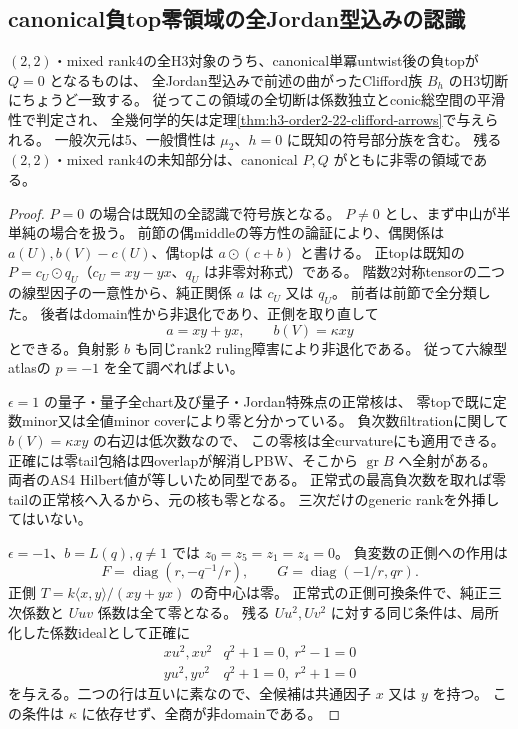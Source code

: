 \subsection{canonical負top零領域の全Jordan型込みの認識}
\label{subsec:h3-order2-22-Qzero-complete}
\begin{theorem}\label{thm:h3-order2-22-Qzero-complete}
$(2,2)$・mixed rank4の全H3対象のうち、canonical単冪untwist後の負topが $Q=0$ となるものは、
全Jordan型込みで前述の曲がったClifford族 $B_h$ のH3切断にちょうど一致する。
従ってこの領域の全切断は係数独立とconic総空間の平滑性で判定され、
全幾何学的矢は定理\ref{thm:h3-order2-22-clifford-arrows}で与えられる。
一般次元は5、一般慣性は $\mu_2$、$h=0$ に既知の符号部分族を含む。
残る $(2,2)$・mixed rank4の未知部分は、canonical $P,Q$ がともに非零の領域である。
\end{theorem}
\begin{proof}
$P=0$ の場合は既知の全認識で符号族となる。
$P\ne0$ とし、まず中山が半単純の場合を扱う。
前節の偶middleの等方性の論証により、偶関係は
$a(U),b(V)-c(U)$、偶topは $a\odot(c+b)$ と書ける。
正topは既知の $P=c_U\odot q_U$（$c_U=xy-yx$、$q_U$ は非零対称式）である。
階数2対称tensorの二つの線型因子の一意性から、純正関係 $a$ は $c_U$ 又は $q_U$。
前者は前節で全分類した。
後者はdomain性から非退化であり、正側を取り直して
\[
 a=xy+yx,\qquad b(V)=\kappa xy
\]
とできる。負射影 $b$ も同じrank2 ruling障害により非退化である。
従って六線型atlasの $p=-1$ を全て調べればよい。

$\epsilon=1$ の量子・量子全chart及び量子・Jordan特殊点の正常核は、
零topで既に定数minor又は全値minor coverにより零と分かっている。
負次数filtrationに関して $b(V)=\kappa xy$ の右辺は低次数なので、
この零核は全curvatureにも適用できる。
正確には零tail包絡は四overlapが解消しPBW、そこから $\operatorname{gr}B$ へ全射がある。
両者のAS4 Hilbert値が等しいため同型である。
正常式の最高負次数を取れば零tailの正常核へ入るから、元の核も零となる。
三次だけのgeneric rankを外挿してはいない。

$\epsilon=-1$、$b=L(q),q\ne1$ では $z_0=z_5=z_1=z_4=0$。
負変数の正側への作用は
\[
 F=\operatorname{diag}(r,-q^{-1}/r),\qquad
 G=\operatorname{diag}(-1/r,qr).
\]
正側 $T=k\langle x,y\rangle/(xy+yx)$ の奇中心は零。
正常式の正側可換条件で、純正三次係数と $Uuv$ 係数は全て零となる。
残る $Uu^2,Uv^2$ に対する同じ条件は、局所化した係数idealとして正確に
\[
 \begin{array}{c|c}
 xu^2,xv^2&q^2+1=0,\ r^2-1=0\\
 yu^2,yv^2&q^2+1=0,\ r^2+1=0
 \end{array}
\]
を与える。二つの行は互いに素なので、全候補は共通因子 $x$ 又は $y$ を持つ。
この条件は $\kappa$ に依存せず、全商が非domainである。


\end{proof}
